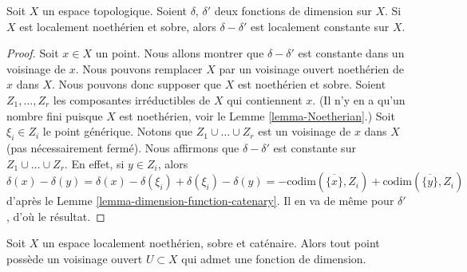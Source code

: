 \begin{lemma}
\label{lemma-dimension-function-unique}
Soit $X$ un espace topologique.
Soient $\delta$, $\delta'$ deux fonctions de dimension sur $X$.
Si $X$ est localement noethérien et sobre, alors $\delta - \delta'$ est
localement constante sur $X$.
\end{lemma}

\begin{proof}
Soit $x \in X$ un point. Nous allons montrer que $\delta - \delta'$ est
constante dans un voisinage de $x$.
Nous pouvons remplacer $X$ par un voisinage ouvert
noethérien de $x$ dans $X$. Nous pouvons donc supposer que $X$ est
noethérien et sobre.
Soient $Z_1, \ldots, Z_r$ les composantes irréductibles de $X$ qui
contiennent $x$. (Il n'y en a qu'un nombre fini puisque
$X$ est noethérien, voir le Lemme \ref{lemma-Noetherian}.)
Soit $\xi_i \in Z_i$ le point générique.
Notons que $Z_1 \cup \ldots \cup Z_r$ est un voisinage de $x$ dans $X$
(pas nécessairement fermé). Nous affirmons que $\delta - \delta'$ est
constante sur $Z_1 \cup \ldots \cup Z_r$. En effet, si $y \in Z_i$,
alors
$$
\delta(x) - \delta(y) = \delta(x) - \delta(\xi_i) + \delta(\xi_i) - \delta(y)
= - \text{codim}(\overline{\{x\}}, Z_i)
+ \text{codim}(\overline{\{y\}}, Z_i)
$$
d'après le Lemme \ref{lemma-dimension-function-catenary}.
Il en va de même pour $\delta'$, d'où le résultat.
\end{proof}

\begin{lemma}
\label{lemma-locally-dimension-function}
Soit $X$ un espace localement noethérien, sobre et caténaire.
Alors tout point possède un voisinage ouvert
$U \subset X$ qui admet une fonction de dimension.
\end{lemma}

